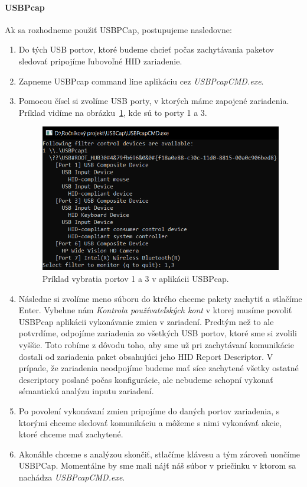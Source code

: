 \paragraph{USBPcap}
Ak sa rozhodneme použiť USBPCap, postupujeme nasledovne:
\begin{enumerate}
\item Do tých USB portov, ktoré budeme chcieť počas zachytávania paketov sledovať pripojíme ľubovoľné HID zariadenie.
\item Zapneme USBPcap command line aplikáciu cez \textit{USBPcapCMD.exe}.
\item\label{kap6:sec:usbpcap_vyber_portov} Pomocou čísel si zvolíme USB porty, v ktorých máme zapojené zariadenia. Príklad vidíme na obrázku~\ref{obr:kap6:usbpcap_ports}, kde sú to porty 1 a 3.

\begin{figure}[!htb]
	\centering
	\includegraphics[width=12cm]{img/kap06_usbpcap_ports}
	\caption{Príklad vybratia portov 1 a 3 v aplikácii USBPcap.}
	\label{obr:kap6:usbpcap_ports}
\end{figure}

\item Následne si zvolíme meno súboru do ktrého chceme pakety zachytiť a stlačíme Enter. Vybehne nám \textit{Kontrola používateľských kont} v ktorej musíme povoliť USBPcap aplikácii vykonávanie zmien v zariadení. Predtým než to ale potvrdíme, odpojíme zariadenia zo všetkých USB portov, ktoré sme si zvolili vyššie. Toto robíme z dôvodu toho, aby sme už pri zachytávaní komunikácie dostali od zariadenia paket obsahujúci jeho HID Report Descriptor. V prípade, že zariadenia neodpojíme budeme mať síce zachytené všetky ostatné descriptory poslané počas konfigurácie, ale nebudeme schopní vykonať sémantickú analýzu inputu zariadení.
\item Po povolení vykonávaní zmien pripojíme do daných portov zariadenia, s ktorými chceme sledovať komunikáciu a môžeme s nimi vykonávať akcie, ktoré chceme mať zachytené.
\item Akonáhle chceme s analýzou skončiť, stlačíme klávesu  a tým zároveň uončíme USBPCap. Momentálne by sme mali nájť náš súbor v priečinku v ktorom sa nachádza \textit{USBPcapCMD.exe}.
\end{enumerate}

